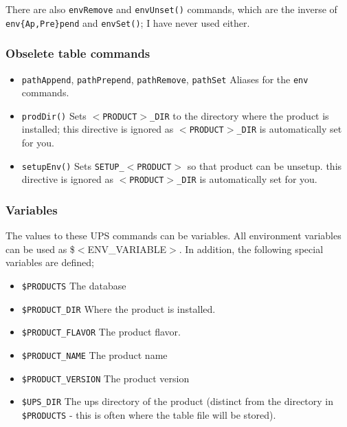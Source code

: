 \documentclass{article}
\begin{document}
There are also \texttt{envRemove} and \texttt{envUnset()} commands, which
are the inverse of \texttt{env\{Ap,Pre\}pend} and \texttt{envSet()}; I have
never used either.     

\subsubsection{Obselete table commands}

\begin{itemize}
   \item \texttt{pathAppend}, \texttt{pathPrepend}, \texttt{pathRemove}, \texttt{pathSet}
     Aliases for the \texttt{env} commands.
     
   \item \texttt{prodDir()}
     Sets \texttt{$<$PRODUCT$>$\_DIR} to the directory where the product is installed;
     this directive is ignored as \texttt{$<$PRODUCT$>$\_DIR} is automatically set for you.
     
   \item \texttt{setupEnv()}
     Sets \texttt{SETUP\_$<$PRODUCT$>$} so that product can be unsetup.
     this directive is ignored as \texttt{$<$PRODUCT$>$\_DIR} is automatically set for you.
\end{itemize}
        
\subsubsection{Variables}

The values to these UPS commands can be variables. All environment
variables can be used as \${$<$ENV\_VARIABLE$>$}. In addition, the following special
variables are defined;

\begin{itemize}
  \item \texttt{\${PRODUCTS}}
    The database
    
  \item \texttt{\${PRODUCT\_DIR}}
    Where the product is installed.
    
  \item \texttt{\${PRODUCT\_FLAVOR}}
    The product flavor.
    
  \item \texttt{\${PRODUCT\_NAME}}
    The product name
    
  \item \texttt{\${PRODUCT\_VERSION}}
    The product version
    
  \item \texttt{\${UPS\_DIR}}
    The ups directory of the product (distinct from the directory
    in \texttt{\$PRODUCTS} - this is often where the table file will be stored).
\end{itemize}
\end{document}
